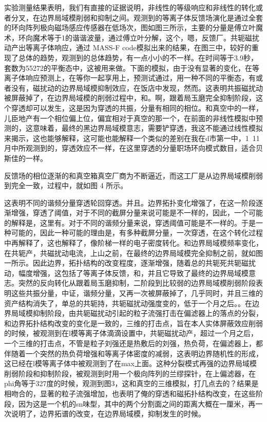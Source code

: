 实验测量结果表明，我们有直接的证据说明，非线性的等级响应和非线性的转化或者分叉，在边界局域模削弱和抑制之间。观测到的等离子体反馈场演化是通过全套的环向阵列极向磁场感应传感器在低场次，图如图三所示，主要的分量是傅立叶魔术，环向魔术等于1的谐谐波量，通过傅立叶分解，这个，嗯，反馈厂。共轭磁扰动产出等离子体响应，通过 MASS-F code模拟出来的结果，在图三中，较好的重现了总体的趋势，观测到的总体趋势，有一点小小的不一样。在时间等于3.9秒，套数为55272的平衡态中，这被用来做。下面的模拟，由于没有显著的变化，在等离子体响应预测上，在等你一起享用上，预测试通过，用一种不同的平衡态，有或者没有，磁扰动的边界局域模抑制效应，在饭店中发现，然而。这表明共振磁扰动被屏蔽掉了，在边界局域模的削弱过程中，和。啊，跟着局玉磨完全抑制阶段，这个穿透却可以发生，这是因为穿透的共振，分量有相同的相位。和真空中的一样，儿臣地产有一个相位偏上位，偏宜相对于真空的那一个，在前面的非线性模拟中预测的，这意味着，最终的黑边界局域模意志，需要铲穿透，我这不能通过线性模拟来揭示，这也能够解释，这可能也能解释一个类似的差别在我在d市第一中，1~11月中所观测到的，穿透效应不一样，在这里穿透的分量职场环向模式数目，适合贝斯佳的一样。



反馈场的相位逐渐的和真空箱真空厂商为不断逼近，而这工厂是从边界局域模削弱到完全一致，过程中，就如图 4 所示。

这表明不同的谐频分量穿透轮回穿透。并且。边界拓扑变化增强了，在这一阶段逐渐增强，穿透了阈值，对于不同的截屏分量来说可能是不一样的，因此，一个可能的解释是，这里有。对于不同的谐频分量来说，穿透阈值可能是不一样的。于是一种可能的，因此一种可能的理由是，有多种截屏分量，一次穿透，在这个转化过程中再解释了，这也解释了，像阶梯一样的电子密度转化。和边界局域模频率变化，在共轭产，共磁扰动电流，上山之前，在最终的边界局域模完全抑制之前，就如图一所示。因此边界，拓扑结构的改变程度，逐渐增强，随着总的共轭死共轭磁扰动，幅度增强，这包括了等离子体反馈，和，并且它导致了最终的边界局域模意志。突然的反向转化从跟着局玉磨抑制，二阶段到比较弱的边界局域模削弱阶段表明这些共振分量，中证，谐频分量，又再一次被屏蔽掉了，几乎同时，并且三维的资产结构消失了，单总的共轭持，共轭磁扰动强度变的，低于一个月之后。。在边界局域模抑制阶段，由共轭磁扰动引起的粒子流强打击在偏滤器上的落点的分裂，和边界拓扑结构改变的变化是一致的，三维的打击点，旨在本人实体屏蔽效应削弱的时候，被观测到在l模等离子体滴滴设置中，共轭磁扰动产，超过一个月之后，一个三维的打击点，不管是粒子刘强还是热敷后的刘强，热负荷，在偏滤器上，都伴随着一个突然的热负荷增强和等离子体密度的减弱，这表明边界随机性的形成，这已经在l模等离子体中被观测到了在max上面。这种分裂模式再强的边界局域模削弱阶段和抑制阶段，被观测到时用一个极向阵列的兰缪探针，在上偏滤器，在phi角等于327度的时候，观测到图3，这和真空的三维模拟，打几点去的？结果是相吻合的，显著的粒子流强增加，也表明了俺的穿透和磁拓扑结构改变，在这些阶段，因为这是一个机的sn味型，其中的两个分割面之间的距离大概在一厘米，再一次说明了，边界拓谱的改变，在边界局域模，抑制发生的时候。

